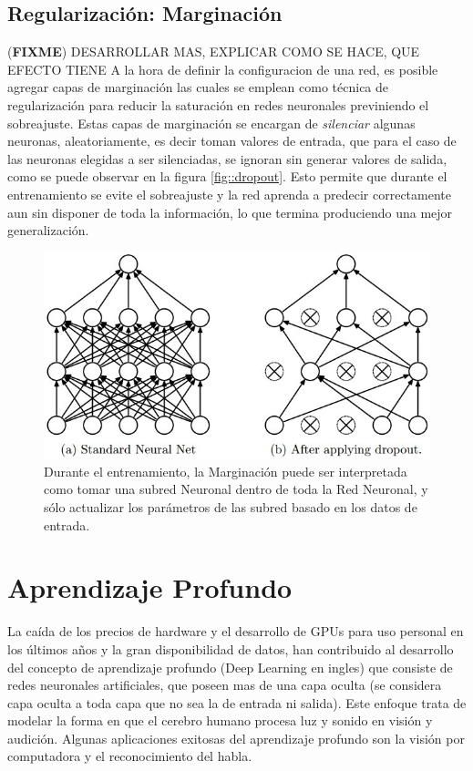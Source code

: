 \documentclass[a4paper,11pt,spanish]{book}
\newcommand*{\FIXME}[1]{{(\textbf{FIXME}) {#1}}}
\begin{document}
      \subsection {Regularización: Marginación}
	\FIXME{DESARROLLAR MAS, EXPLICAR COMO SE HACE, QUE EFECTO TIENE}
	A la hora de definir la configuracion de una red, es posible agregar capas de marginación las cuales se emplean como 
	técnica de regularización para reducir la saturación en redes neuronales previniendo el sobreajuste. Estas capas de marginación se encargan de 
	\emph{silenciar} algunas neuronas, aleatoriamente, es decir toman valores de entrada, que para el caso de las neuronas elegidas a ser silenciadas, se ignoran
	sin generar valores de salida, como se puede observar en la figura \ref{fig::dropout}. Esto permite que durante el entrenamiento se evite el sobreajuste y la red aprenda 
	a predecir correctamente aun sin disponer de toda la información, lo que termina produciendo una mejor generalización.
	\begin{figure}[H]
	  \begin{center}
	   \includegraphics[width=0.6\linewidth]{./img/dropout.jpeg}
	  \end{center}
	  \caption{Durante el entrenamiento, la Marginación puede ser interpretada como tomar una subred Neuronal dentro de toda la Red Neuronal, y sólo actualizar los parámetros
	  de las subred basado en los datos de entrada. \cite{Srivastava:Dropout} }
	  \label{fig:dropout}
	\end{figure}

  \section {Aprendizaje Profundo}
    La caída de los precios de hardware y el desarrollo de GPUs para uso personal en los últimos años y la gran disponibilidad de datos, han contribuido al desarrollo del
    concepto de aprendizaje profundo (Deep Learning en ingles)
    que consiste de redes neuronales artificiales, que poseen mas de una capa oculta (se considera capa oculta a toda capa que no sea la de entrada ni salida). Este enfoque trata de
    modelar la forma en que el cerebro humano procesa luz y sonido en visión y audición.
    Algunas aplicaciones exitosas del aprendizaje profundo son la visión por computadora y el reconocimiento del habla.
\end{document}
